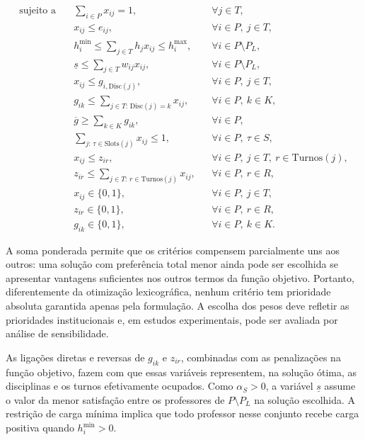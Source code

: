 \documentclass[11pt,a4paper]{article}
\begin{document}
\begin{align}
\text{sujeito a}\quad
& \sum_{i\in P}x_{ij}=1, && \forall j\in T, \label{eq:cobertura}\\
& x_{ij}\leq e_{ij}, && \forall i\in P,\ j\in T, \label{eq:elegibilidade}\\
& h_i^{\min}\leq\sum_{j\in T}h_jx_{ij}\leq h_i^{\max},
&& \forall i\in P\setminus P_L, \label{eq:capacidade}\\
& \underline{s}\leq\sum_{j\in T}w_{ij}x_{ij},
&& \forall i\in P\setminus P_L, \label{eq:piso_satisfacao}\\
& x_{ij}\leq g_{i,\mathrm{Disc}(j)}, && \forall i\in P,\ j\in T, \label{eq:liga_disciplina}\\
& g_{ik}\leq\sum_{j\in T:\,\mathrm{Disc}(j)=k}x_{ij},
&& \forall i\in P,\ k\in K, \label{eq:liga_disciplina_reversa}\\
& \overline{g}\geq\sum_{k\in K}g_{ik}, && \forall i\in P, \label{eq:teto_disciplinas}\\
& \sum_{j:\,\tau\in\mathrm{Slots}(j)}x_{ij}\leq1,
&& \forall i\in P,\ \tau\in S, \label{eq:conflito}\\
& x_{ij}\leq z_{ir},
&& \forall i\in P,\ j\in T,\ r\in\mathrm{Turnos}(j), \label{eq:compactacao}\\
& z_{ir}\leq\sum_{j\in T:\,r\in\mathrm{Turnos}(j)}x_{ij},
&& \forall i\in P,\ r\in R, \label{eq:compactacao_reversa}\\
& x_{ij}\in\{0,1\}, && \forall i\in P,\ j\in T, \label{eq:dom_x}\\
& z_{ir}\in\{0,1\}, && \forall i\in P,\ r\in R, \label{eq:dom_z}\\
& g_{ik}\in\{0,1\}, && \forall i\in P,\ k\in K. \label{eq:dom_g}
\end{align}

A soma ponderada permite que os critérios compensem parcialmente uns aos outros: uma solução com preferência total menor ainda pode ser escolhida se apresentar vantagens suficientes nos outros termos da função objetivo. Portanto, diferentemente da otimização lexicográfica, nenhum critério tem prioridade absoluta garantida apenas pela formulação. A escolha dos pesos deve refletir as prioridades institucionais e, em estudos experimentais, pode ser avaliada por análise de sensibilidade.

As ligações diretas e reversas de $g_{ik}$ e $z_{ir}$, combinadas com as penalizações na função objetivo, fazem com que essas variáveis representem, na solução ótima, as disciplinas e os turnos efetivamente ocupados. Como $\alpha_S>0$, a variável $\underline{s}$ assume o valor da menor satisfação entre os professores de $P\setminus P_L$ na solução escolhida. A restrição de carga mínima implica que todo professor nesse conjunto recebe carga positiva quando $h_i^{\min}>0$.
\end{document}
